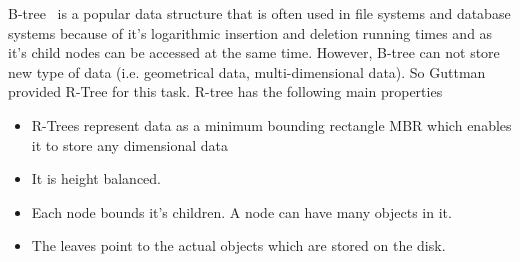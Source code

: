 B-tree~\cite{BTREE} is a  popular data structure that is often used in file systems and database systems because of it's logarithmic insertion and deletion running times and as it's child nodes can be accessed at the same time. However, B-tree can not store new type of data (i.e. geometrical data, multi-dimensional data). So Guttman ~\cite{RT2} provided R-Tree for this task. R-tree has the following main properties
\begin{itemize}
\item  R-Trees represent data as a minimum bounding rectangle MBR which enables it to store any dimensional data
\item It is height balanced.
\item Each node bounds it's children. A node can have many objects in it.
\item The leaves point to the actual objects which are stored on the disk.

\end{itemize}


\endinput 
